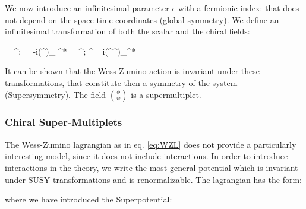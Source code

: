 We now introduce an infinitesimal parameter $\epsilon$ with a fermionic index: 
that does not depend on the space-time coordinates (global symmetry). We define an infinitesimal transformation of both the scalar and the chiral fields:

\beq
\delta \phi = \epsilon^\dagger \psi \qquad ;  \qquad \delta \psi = -i(\sigma^\nu \epsilon)\partial_\nu \phi 
\delta \phi^* = \psi^\dagger \epsilon \qquad  ; \qquad \delta \psi^\dagger = i(\epsilon^\dagger \sigma^\nu )\partial_\nu \phi^*
\eeq

It can be shown that the Wess-Zumino action is invariant under these transformations, that constitute then a symmetry of the system (Supersymmetry). The field $\binom{\phi}{\psi}$  is a supermultiplet.


\subsubsection*{Chiral Super-Multiplets}

The Wess-Zumino lagrangian as in eq. \ref{eq:WZL} does not provide a particularly interesting model, since it does not include interactions. In order to introduce interactions in the theory, we write the most general potential which is invariant under SUSY transformations and is renormalizable. The lagrangian has the form:


where we have introduced the Superpotential:

